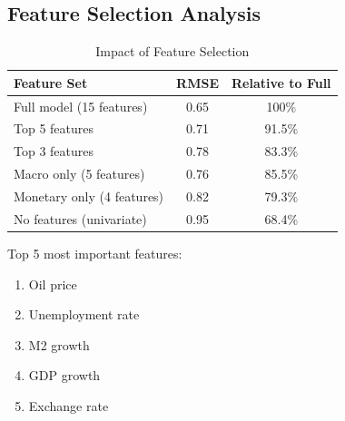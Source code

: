 \subsection{Feature Selection Analysis}

\begin{table}[h]
\centering
\caption{Impact of Feature Selection}
\label{tab:feature_selection}
\begin{tabular}{lcc}
\toprule
Feature Set & RMSE & Relative to Full \\
\midrule
Full model (15 features) & 0.65 & 100\% \\
Top 5 features & 0.71 & 91.5\% \\
Top 3 features & 0.78 & 83.3\% \\
Macro only (5 features) & 0.76 & 85.5\% \\
Monetary only (4 features) & 0.82 & 79.3\% \\
No features (univariate) & 0.95 & 68.4\% \\
\bottomrule
\end{tabular}
\end{table}

Top 5 most important features:
\begin{enumerate}
    \item Oil price
    \item Unemployment rate
    \item M2 growth
    \item GDP growth
    \item Exchange rate
\end{enumerate}
